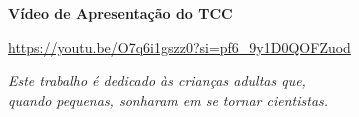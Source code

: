 \documentclass[
12pt,
 a4paper,
    english,
    brazil,
    oneside
    ]{abntex2}
\begin{document}
	
	
	\frenchspacing 
	
	
	\renewcommand{\imprimircapa}{%
		\begin{capa}%
			\center
			{\ABNTEXchapterfont\large\imprimirautor}
			\vspace*{\fill}
			
			{\ABNTEXchapterfont\bfseries\LARGE\imprimirtitulo}
			
			\vspace*{5cm}
			\textbf{Vídeo de Apresentação do TCC}
			
			\href{https://youtu.be/O7q6i1gszz0?si=pf6_9y1D0QOFZuod}{https://youtu.be/O7q6i1gszz0?si=pf6\_9y1D0QOFZuod}	
			\vspace*{\fill}
			
			{\large\imprimirlocal}
			\par
			{\large\imprimirdata}
			\vspace*{1cm}
		\end{capa}
	}
	\imprimircapa
	
	\imprimirfolhaderosto
	
	\begin{dedicatoria}
		\vspace*{\fill}
		\centering
		\noindent
		\textit{
			Este trabalho é dedicado às crianças adultas que,\\
			quando pequenas, sonharam em se tornar cientistas.\\
			}
	\end{dedicatoria}
	
\end{document}
